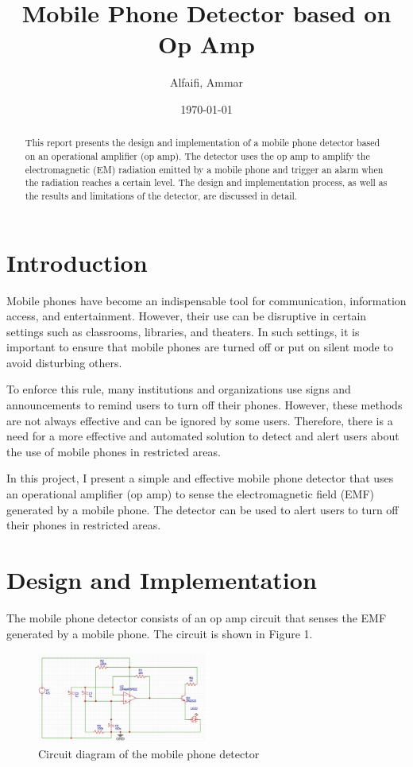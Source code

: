 \documentclass[a4paper, 11pt]{report}
\title{Mobile Phone Detector based on Op Amp}
\author{Alfaifi, Ammar}
\date{\today}
\begin{document}
\maketitle

\begin{abstract}
	This report presents the design and implementation of a mobile phone detector based on an operational amplifier (op amp). The detector uses the op amp to amplify the electromagnetic (EM) radiation emitted by a mobile phone and trigger an alarm when the radiation reaches a certain level. The design and implementation process, as well as the results and limitations of the detector, are discussed in detail.
\end{abstract}

\section{Introduction}

Mobile phones have become an indispensable tool for communication, information access, and entertainment. However, their use can be disruptive in certain settings such as classrooms, libraries, and theaters. In such settings, it is important to ensure that mobile phones are turned off or put on silent mode to avoid disturbing others.

To enforce this rule, many institutions and organizations use signs and announcements to remind users to turn off their phones. However, these methods are not always effective and can be ignored by some users. Therefore, there is a need for a more effective and automated solution to detect and alert users about the use of mobile phones in restricted areas.

In this project, I present a simple and effective mobile phone detector that uses an operational amplifier (op amp) to sense the electromagnetic field (EMF) generated by a mobile phone. The detector can be used to alert users to turn off their phones in restricted areas.

\section{Design and Implementation}

The mobile phone detector consists of an op amp circuit that senses the EMF generated by a mobile phone. The circuit is shown in Figure 1.

\begin{figure}[ht]
	\centering
	\includegraphics[width=0.5\textwidth]{detector-circuit.png}
	\caption{Circuit diagram of the mobile phone detector}
	\label{fig:circuit-diagram}
\end{figure}
\end{document}
